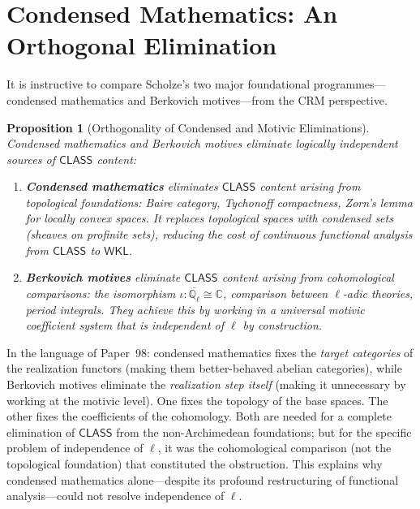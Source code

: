 \documentclass[11pt,a4paper]{article}
\theoremstyle{plain}
\newtheorem{proposition}[theorem]{Proposition}
\theoremstyle{definition}
\newcommand{\WKL}{\textsf{WKL}}
\newcommand{\CLASS}{\textsf{CLASS}}
\newcommand{\Q}{\mathbb{Q}}
\newcommand{\C}{\mathbb{C}}
\begin{document}
\section{Condensed Mathematics: An Orthogonal Elimination}\label{sec:condensed}

It is instructive to compare Scholze's two major foundational programmes---condensed mathematics and Berkovich motives---from the CRM perspective.

\begin{proposition}[Orthogonality of Condensed and Motivic Eliminations]\label{prop:orthogonal}
Condensed mathematics and Berkovich motives eliminate logically independent sources of $\CLASS$ content:
\begin{enumerate}[label=(\roman*)]
\item \textbf{Condensed mathematics} eliminates $\CLASS$ content arising from \emph{topological foundations}: Baire category, Tychonoff compactness, Zorn's lemma for locally convex spaces. It replaces topological spaces with condensed sets (sheaves on profinite sets), reducing the cost of continuous functional analysis from $\CLASS$ to $\WKL$.
\item \textbf{Berkovich motives} eliminate $\CLASS$ content arising from \emph{cohomological comparisons}: the isomorphism $\iota: \overline{\Q_\ell} \cong \C$, comparison between $\ell$-adic theories, period integrals. They achieve this by working in a universal motivic coefficient system that is independent of $\ell$ by construction.
\end{enumerate}
\end{proposition}

In the language of Paper~98: condensed mathematics fixes the \emph{target categories} of the realization functors (making them better-behaved abelian categories), while Berkovich motives eliminate the \emph{realization step itself} (making it unnecessary by working at the motivic level). One fixes the topology of the base spaces. The other fixes the coefficients of the cohomology. Both are needed for a complete elimination of $\CLASS$ from the non-Archimedean foundations; but for the specific problem of independence of $\ell$, it was the cohomological comparison (not the topological foundation) that constituted the obstruction. This explains why condensed mathematics alone---despite its profound restructuring of functional analysis---could not resolve independence of $\ell$.
\end{document}
